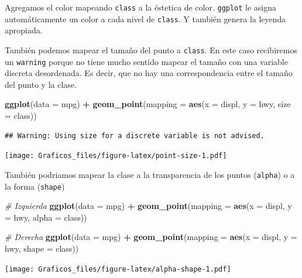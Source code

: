 \documentclass[]{book}
\newenvironment{Shaded}{\begin{snugshade}}{\end{snugshade}}
\newcommand{\CommentTok}[1]{\textcolor[rgb]{0.56,0.35,0.01}{\textit{#1}}}
\newcommand{\DataTypeTok}[1]{\textcolor[rgb]{0.13,0.29,0.53}{#1}}
\newcommand{\KeywordTok}[1]{\textcolor[rgb]{0.13,0.29,0.53}{\textbf{#1}}}
\newcommand{\NormalTok}[1]{#1}
\newcommand{\OperatorTok}[1]{\textcolor[rgb]{0.81,0.36,0.00}{\textbf{#1}}}
\newcommand{\StringTok}[1]{\textcolor[rgb]{0.31,0.60,0.02}{#1}}
\theoremstyle{definition}
\theoremstyle{definition}
\theoremstyle{definition}
\theoremstyle{remark}
\begin{document}
Agregamos el color mapeando \texttt{class} a la éstetica de color.
\texttt{ggplot} le asigna automáticamente un color a cada nivel de
\texttt{class}. Y también genera la leyenda apropiada.

También podemos mapear el tamaño del punto a \texttt{class}. En este
caso recibiremos un \texttt{warning} porque no tiene mucho sentido
mapear el tamaño con una variable discreta desordenada. Es decir, que no
hay una correspondencia entre el tamaño del punto y la clase.

\begin{Shaded}
\begin{Highlighting}[]
\KeywordTok{ggplot}\NormalTok{(}\DataTypeTok{data =}\NormalTok{ mpg) }\OperatorTok{+}
\StringTok{ }\KeywordTok{geom_point}\NormalTok{(}\DataTypeTok{mapping =} \KeywordTok{aes}\NormalTok{(}\DataTypeTok{x =}\NormalTok{ displ, }\DataTypeTok{y =}\NormalTok{ hwy, }\DataTypeTok{size =}\NormalTok{ class))}
\end{Highlighting}
\end{Shaded}

\begin{verbatim}
## Warning: Using size for a discrete variable is not advised.
\end{verbatim}

\texttt{[image: Graficos\_files/figure-latex/point-size-1.pdf]}

También podriamos mapear la clase a la transparencia de los puntos
(\texttt{alpha}) o a la forma (\texttt{shape})

\begin{Shaded}
\begin{Highlighting}[]
\CommentTok{# Izquierda}
\KeywordTok{ggplot}\NormalTok{(}\DataTypeTok{data =}\NormalTok{ mpg) }\OperatorTok{+}\StringTok{ }
\StringTok{  }\KeywordTok{geom_point}\NormalTok{(}\DataTypeTok{mapping =} \KeywordTok{aes}\NormalTok{(}\DataTypeTok{x =}\NormalTok{ displ, }\DataTypeTok{y =}\NormalTok{ hwy, }\DataTypeTok{alpha =}\NormalTok{ class))}

\CommentTok{# Derecha}
\KeywordTok{ggplot}\NormalTok{(}\DataTypeTok{data =}\NormalTok{ mpg) }\OperatorTok{+}\StringTok{ }
\StringTok{  }\KeywordTok{geom_point}\NormalTok{(}\DataTypeTok{mapping =} \KeywordTok{aes}\NormalTok{(}\DataTypeTok{x =}\NormalTok{ displ, }\DataTypeTok{y =}\NormalTok{ hwy, }\DataTypeTok{shape =}\NormalTok{ class))}
\end{Highlighting}
\end{Shaded}

\texttt{[image: Graficos\_files/figure-latex/alpha-shape-1.pdf]}
\end{document}
